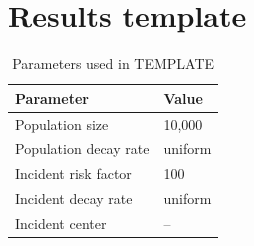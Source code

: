 \section*{Results template}
\label{sec:results:template}
\graphicspath{{./results/unif_100_1.0_1h/}}
\makeatletter
{}
\makeatother

\begin{table}[htbp]
\centering
\begin{tabular}{ll}
\hline
Parameter & Value \\
\hline
Population size & 10,000 \\
Population decay rate & uniform \\
Incident risk factor & 100 \\
Incident decay rate & uniform \\
Incident center & -- \\
\hline
\end{tabular}
\caption{Parameters used in TEMPLATE}
\label{tab:params:template}
\end{table}

